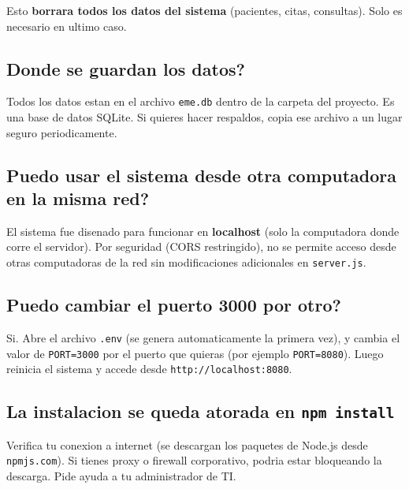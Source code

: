 \documentclass[11pt,a4paper]{article}
\begin{document}
\begin{cajaCritica}
    Esto \textbf{borrara todos los datos del sistema} (pacientes, citas, consultas). Solo es necesario en ultimo caso.
\end{cajaCritica}

\subsection*{Donde se guardan los datos?}

Todos los datos estan en el archivo \texttt{eme.db} dentro de la carpeta del proyecto. Es una base de datos SQLite. Si quieres hacer respaldos, copia ese archivo a un lugar seguro periodicamente.
\subsection*{Puedo usar el sistema desde otra computadora en la misma red?}

El sistema fue disenado para funcionar en \textbf{localhost} (solo la computadora donde corre el servidor). Por seguridad (CORS restringido), no se permite acceso desde otras computadoras de la red sin modificaciones adicionales en \texttt{server.js}.
\subsection*{Puedo cambiar el puerto 3000 por otro?}

Si. Abre el archivo \texttt{.env} (se genera automaticamente la primera vez), y cambia el valor de \texttt{PORT=3000} por el puerto que quieras (por ejemplo \texttt{PORT=8080}). Luego reinicia el sistema y accede desde \texttt{http://localhost:8080}.

\subsection*{La instalacion se queda atorada en \texttt{npm install}}

Verifica tu conexion a internet (se descargan los paquetes de Node.js desde \texttt{npmjs.com}). Si tienes proxy o firewall corporativo, podria estar bloqueando la descarga. Pide ayuda a tu administrador de TI.
\end{document}
